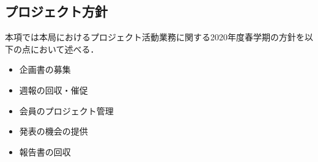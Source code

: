 ﻿\subsection*{プロジェクト方針}


本項では本局におけるプロジェクト活動業務に関する2020年度春学期の方針を以下の点において述べる．

\begin{itemize}
\item 企画書の募集
\item 週報の回収・催促
\item 会員のプロジェクト管理
\item 発表の機会の提供
\item 報告書の回収
\end{itemize}
